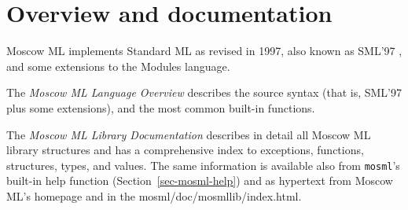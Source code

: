 \documentclass[fleqn]{article}
\begin{document}
%
%
%
%
%
%
%

\newpage

\section{Overview and documentation}

Moscow ML implements Standard ML as revised in 1997, also known as
SML'97 \cite{Milner:1997:TheDefinition, Milner:1990:TheDefinition},
and some extensions to the Modules language.  

The {\em Moscow ML Language Overview\/}
\cite{MoscowML:2000:MoscowMLLanguage} describes the source syntax
(that is, SML'97 plus some extensions), and the most common built-in
functions.

The \emph{Moscow ML Library Documentation}
\cite{MoscowML:2000:MoscowMLLibrary} describes in detail all Moscow ML
library structures and has a comprehensive index to exceptions,
functions, structures, types, and values.  The same information is
available also from {\tt mosml}'s built-in help function
(Section~\ref{sec-mosml-help}) and as hypertext from Moscow ML's
homepage and in the mosml/doc/mosmllib/index.html.
\end{document}
